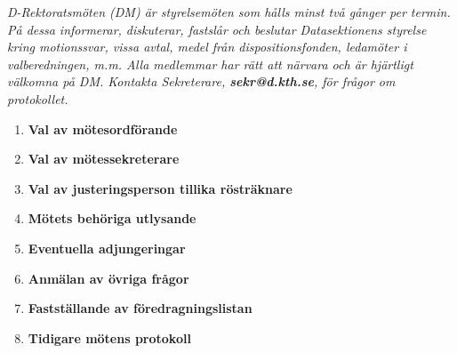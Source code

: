 \documentclass{protokoll}
\begin{document}
{\small \textit{D-Rektoratsmöten (DM) är styrelsemöten som hålls minst två gånger per termin. På dessa informerar, diskuterar, fastslår och beslutar Datasektionens styrelse kring motionssvar, vissa avtal, medel från dispositionsfonden, ledamöter i valberedningen, m.m. Alla medlemmar  har rätt att närvara och är hjärtligt välkomna på DM. Kontakta Sekreterare, \textit{\textbf{sekr@d.kth.se}}, för frågor om protokollet.}} %

\begin{motesfakta} %
  \narvarande
\end{motesfakta}




  \begin{enumerate}
    \item\textbf{Val av mötesordförande}
    \item\textbf{Val av mötessekreterare}
    \item\textbf{Val av justeringsperson tillika rösträknare}
    \item\textbf{Mötets behöriga utlysande}
    \item\textbf{Eventuella adjungeringar}
    \item\textbf{Anmälan av övriga frågor}
    \item\textbf{Fastställande av föredragningslistan}
    \item\textbf{Tidigare mötens protokoll}
  \end{enumerate}
\end{document}
